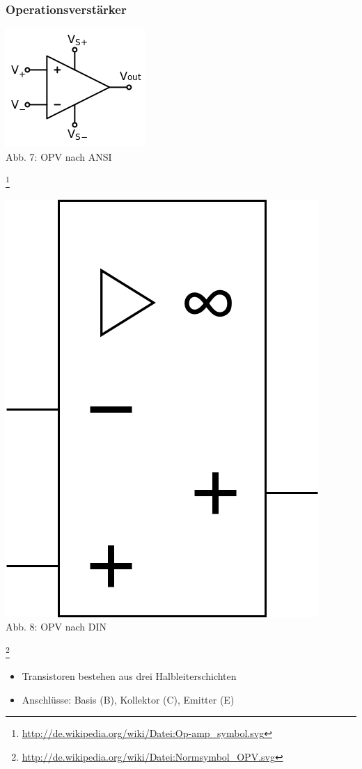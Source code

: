 \begin{frame}
\frametitle{Operationsverstärker}
\begin{minipage}{0.4\textwidth}
	\includegraphics[scale=0.6]{e13/OPV.png}\\
	Abb. 7: OPV nach ANSI
\end{minipage}
\footnote{\url{http://de.wikipedia.org/wiki/Datei:Op-amp_symbol.svg}}
\hspace{0.5cm}
\begin{minipage}{0.4\textwidth}
	\includegraphics[scale=0.2 ]{e13/OPV-ger.png}\\
	Abb. 8: OPV nach DIN
\end{minipage}
\footnote{\url{http://de.wikipedia.org/wiki/Datei:Normsymbol_OPV.svg}}
\vspace{0.5cm}
\begin{center}
\begin{itemize}
	\item Transistoren bestehen aus drei Halbleiterschichten
	\item Anschlüsse: Basis (B), Kollektor (C), Emitter (E)
\end{itemize}
\end{center}
\end{frame}

